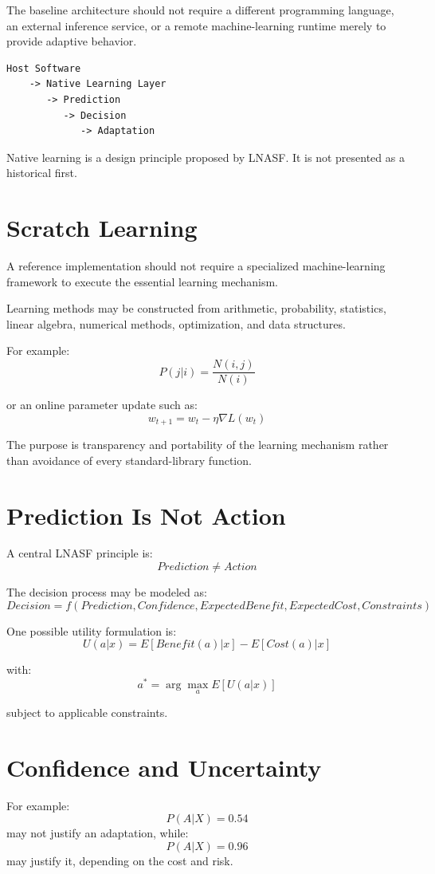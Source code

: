 \documentclass[11pt,a4paper]{article}
\begin{document}
The baseline architecture should not require a different programming language, an external inference service, or a remote machine-learning runtime merely to provide adaptive behavior.

\begin{lstlisting}
Host Software
    -> Native Learning Layer
       -> Prediction
          -> Decision
             -> Adaptation
\end{lstlisting}

Native learning is a design principle proposed by LNASF. It is not presented as a historical first.

\section{Scratch Learning}
A reference implementation should not require a specialized machine-learning framework to execute the essential learning mechanism.

Learning methods may be constructed from arithmetic, probability, statistics, linear algebra, numerical methods, optimization, and data structures.

For example:
\[
P(j|i)=\frac{N(i,j)}{N(i)}
\]

or an online parameter update such as:
\[
w_{t+1}=w_t-\eta\nabla L(w_t)
\]

The purpose is transparency and portability of the learning mechanism rather than avoidance of every standard-library function.

\section{Prediction Is Not Action}
A central LNASF principle is:
\[
Prediction \neq Action
\]

The decision process may be modeled as:
\[
Decision=f(Prediction,Confidence,ExpectedBenefit,ExpectedCost,Constraints)
\]

One possible utility formulation is:
\[
U(a|x)=E[Benefit(a)|x]-E[Cost(a)|x]
\]

with:
\[
a^*=\arg\max_a E[U(a|x)]
\]

subject to applicable constraints.

\section{Confidence and Uncertainty}
For example:
\[
P(A|X)=0.54
\]
may not justify an adaptation, while:
\[
P(A|X)=0.96
\]
may justify it, depending on the cost and risk.
\end{document}
